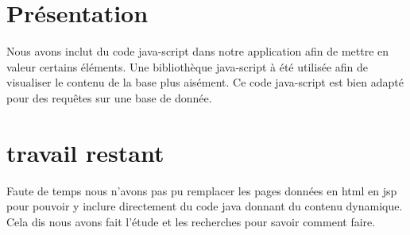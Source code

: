 ﻿\documentclass[12pt]{article}
\begin{document}
\section{ Présentation}
Nous avons inclut du code java-script dans notre application afin de  mettre en valeur certains éléments. Une bibliothèque java-script à été utilisée afin de visualiser le contenu de la base plus aisément. Ce code java-script est bien adapté pour des requêtes sur une base de donnée.


\section{travail restant}

Faute de temps nous n'avons pas pu remplacer les pages données en html en jsp pour pouvoir y inclure directement du code java donnant du contenu dynamique.
Cela dis nous avons fait l'étude et les recherches pour savoir comment faire.
\end{document}

